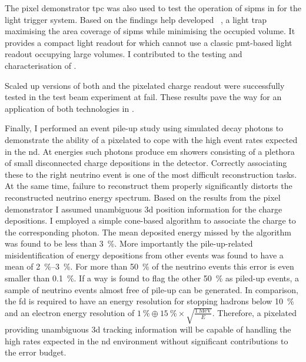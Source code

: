 The pixel demonstrator \gls{tpc} was also used to test the operation of \glspl{sipm} in \lar{} for the light trigger system.
Based on the findings \gls{help} developed \AL{}~\cite{arclight}, a light trap maximising the area coverage of \glspl{sipm} while minimising the occupied volume.
It provides a compact light readout for \AC{} which cannot use a classic \gls{pmt}-based light readout occupying large volumes.
I contributed to the testing and characterisation of \AL{}.

Scaled up versions of both \AL{} and the pixelated charge readout were successfully tested in the \pixlar{} test beam experiment at \gls{fail}.
These results pave the way for an application of both technologies in \AC{}.

Finally, I performed an event pile-up study using simulated \Pgpz decay photons to demonstrate the ability of a pixelated \lartpc{} to cope with the high event rates expected in the \dune{} \gls{nd}.
At \dune{} energies such photons produce \gls{em} showers consisting of a plethora of small disconnected charge depositions in the detector.
Correctly associating these to the right neutrino event is one of the most difficult reconstruction tasks.
At the same time, failure to reconstruct them properly significantly distorts the reconstructed neutrino energy spectrum.
Based on the results from the pixel demonstrator I assumed unambiguous \gls{3d} position information for the charge depositions.
I employed a simple cone-based algorithm to associate the charge to the corresponding photon.
The mean deposited energy missed by the algorithm was found to be less than \SI{3}{\percent}.
More importantly the pile-up-related misidentification of energy depositions from other events was found to have a mean of \SIrange{2}{3}{\percent}.
For more than \SI{50}{\percent} of the neutrino events this error is even smaller than \SI{0.1}{\percent}.
If a way is found to flag the other \SI{50}{\percent} as piled-up events, a sample of neutrino events almost free of pile-up can be generated.
In comparison, the \gls{fd} is required to have an energy resolution for stopping hadrons below \SI{10}{\percent} and an electron energy resolution of $\SI{1}{\percent} \oplus \SI{15}{\percent} \times \sqrt{\frac{\SI{1}{\mega\electronvolt}}{E}}$.
Therefore, a pixelated \AC{} providing unambiguous \gls{3d} tracking information will be capable of handling the high rates expected in the \dune{} \gls{nd} environment without significant contributions to the error budget.


